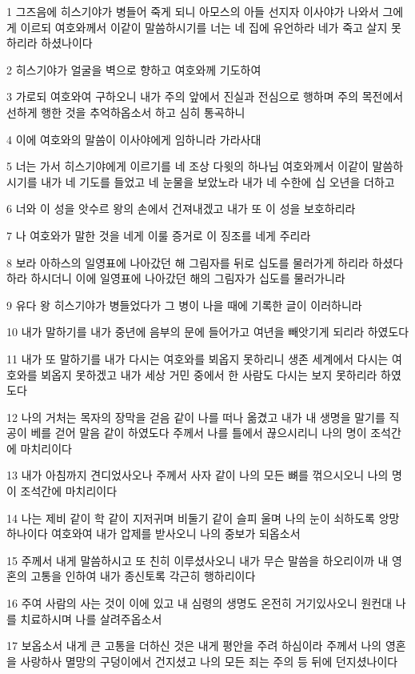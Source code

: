 \par 1 그즈음에 히스기야가 병들어 죽게 되니 아모스의 아들 선지자 이사야가 나와서 그에게 이르되 여호와께서 이같이 말씀하시기를 너는 네 집에 유언하라 네가 죽고 살지 못하리라 하셨나이다
\par 2 히스기야가 얼굴을 벽으로 향하고 여호와께 기도하여
\par 3 가로되 여호와여 구하오니 내가 주의 앞에서 진실과 전심으로 행하며 주의 목전에서 선하게 행한 것을 추억하옵소서 하고 심히 통곡하니
\par 4 이에 여호와의 말씀이 이사야에게 임하니라 가라사대
\par 5 너는 가서 히스기야에게 이르기를 네 조상 다윗의 하나님 여호와께서 이같이 말씀하시기를 내가 네 기도를 들었고 네 눈물을 보았노라 내가 네 수한에 십 오년을 더하고
\par 6 너와 이 성을 앗수르 왕의 손에서 건져내겠고 내가 또 이 성을 보호하리라
\par 7 나 여호와가 말한 것을 네게 이룰 증거로 이 징조를 네게 주리라
\par 8 보라 아하스의 일영표에 나아갔던 해 그림자를 뒤로 십도를 물러가게 하리라 하셨다 하라 하시더니 이에 일영표에 나아갔던 해의 그림자가 십도를 물러가니라
\par 9 유다 왕 히스기야가 병들었다가 그 병이 나을 때에 기록한 글이 이러하니라
\par 10 내가 말하기를 내가 중년에 음부의 문에 들어가고 여년을 빼앗기게 되리라 하였도다
\par 11 내가 또 말하기를 내가 다시는 여호와를 뵈옵지 못하리니 생존 세계에서 다시는 여호와를 뵈옵지 못하겠고 내가 세상 거민 중에서 한 사람도 다시는 보지 못하리라 하였도다
\par 12 나의 거처는 목자의 장막을 걷음 같이 나를 떠나 옮겼고 내가 내 생명을 말기를 직공이 베를 걷어 말음 같이 하였도다 주께서 나를 틀에서 끊으시리니 나의 명이 조석간에 마치리이다
\par 13 내가 아침까지 견디었사오나 주께서 사자 같이 나의 모든 뼈를 꺾으시오니 나의 명이 조석간에 마치리이다
\par 14 나는 제비 같이 학 같이 지저귀며 비둘기 같이 슬피 울며 나의 눈이 쇠하도록 앙망하나이다 여호와여 내가 압제를 받사오니 나의 중보가 되옵소서
\par 15 주께서 내게 말씀하시고 또 친히 이루셨사오니 내가 무슨 말씀을 하오리이까 내 영혼의 고통을 인하여 내가 종신토록 각근히 행하리이다
\par 16 주여 사람의 사는 것이 이에 있고 내 심령의 생명도 온전히 거기있사오니 원컨대 나를 치료하시며 나를 살려주옵소서
\par 17 보옵소서 내게 큰 고통을 더하신 것은 내게 평안을 주려 하심이라 주께서 나의 영혼을 사랑하사 멸망의 구덩이에서 건지셨고 나의 모든 죄는 주의 등 뒤에 던지셨나이다
